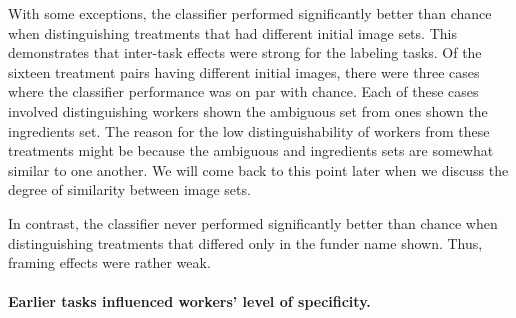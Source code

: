 \documentclass[letterpaper,twocolumn]{article}
\begin{document}
With some exceptions, the classifier performed significantly better 
than chance when distinguishing treatments that had different initial image 
sets.  This demonstrates that inter-task effects were strong for the labeling 
tasks.  Of the sixteen treatment pairs having different initial images, there 
were three cases where the classifier performance was on par with chance. 
Each of these cases involved distinguishing workers shown the ambiguous set 
from ones shown the ingredients set.  The reason for the low 
distinguishability of workers from these treatments might be because
the ambiguous and ingredients sets are somewhat similar to one another.
We will come back to this point later when we discuss the degree of similarity 
between image sets.

In contrast, the classifier never performed significantly better than chance
when distinguishing treatments that differed only in the funder name shown. 
Thus, framing effects were rather weak.

\paragraph{Earlier tasks influenced workers' level of specificity.} 
\begin{figure}
\end{figure}
\end{document}
